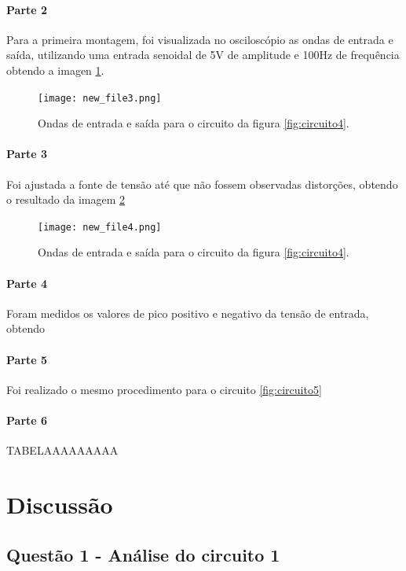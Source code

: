 \documentclass{abntex2}
\begin{document}
\subsubsection{Parte 2}
Para a primeira montagem, foi visualizada no osciloscópio as ondas de entrada e saída, utilizando uma entrada senoidal de 5V de amplitude e 100Hz de frequência obtendo a imagen \ref{fig:inout3}.
\begin{figure}[h]
  \centering
  \texttt{[image: new\_file3.png]}
  \caption{Ondas de entrada e saída para o circuito da figura \ref{fig:circuito4}.}
  \label{fig:inout3}
\end{figure}

\subsubsection{Parte 3}

Foi ajustada a fonte de tensão até que não fossem observadas distorções, obtendo o resultado da imagem \ref{fig:inout4}
\begin{figure}[h]
  \centering
  \texttt{[image: new\_file4.png]}
  \caption{Ondas de entrada e saída para o circuito da figura \ref{fig:circuito4}.}
  \label{fig:inout4}
\end{figure}

\subsubsection{Parte 4}
Foram medidos os valores de pico positivo e negativo da tensão de entrada, obtendo

\subsubsection{Parte 5}
Foi realizado o mesmo procedimento para o circuito \ref{fig:circuito5}



\subsubsection{Parte 6}
TABELAAAAAAAAA


\chapter{Discussão}

\section{Questão 1 - Análise do circuito 1}
\end{document}
